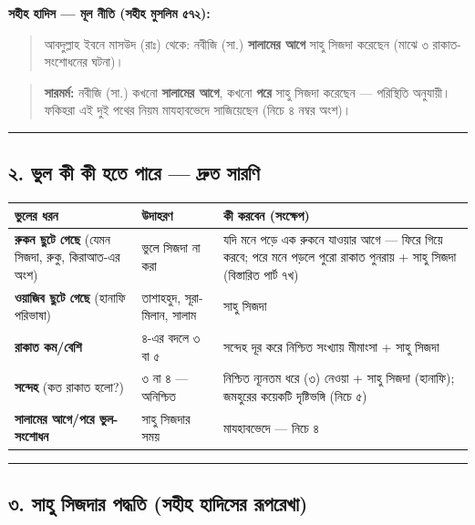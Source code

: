 \textbf{সহীহ হাদিস — মূল নীতি (সহীহ মুসলিম ৫৭২):}

\begin{quote}
আবদুল্লাহ ইবনে মাসউদ (রাঃ) থেকে: নবীজি (সা.) \textbf{সালামের আগে} সাহু সিজদা করেছেন (মাঝে ৩ রাকাত-সংশোধনের ঘটনা)।
\end{quote}

\begin{quote}
\textbf{সারমর্ম:} নবীজি (সা.) কখনো \textbf{সালামের আগে}, কখনো \textbf{পরে} সাহু সিজদা করেছেন — পরিস্থিতি অনুযায়ী। ফকিহরা এই দুই পথের নিয়ম মাযহাবভেদে সাজিয়েছেন (নিচে ৪ নম্বর অংশ)।
\end{quote}

\medskip\hrule\medskip

\subsection*{২. ভুল কী কী হতে পারে — দ্রুত সারণি}

\begin{table}[h]\centering\small
\begin{tabular}{lll}
ভুলের ধরন & উদাহরণ & কী করবেন (সংক্ষেপ) \\
\hline
\textbf{রুকন ছুটে গেছে} (যেমন সিজদা, রুকু, কিরাআত-এর অংশ) & ভুলে সিজদা না করা & যদি মনে পড়ে এক রুকনে যাওয়ার আগে — ফিরে গিয়ে করবে; পরে মনে পড়লে পুরো রাকাত পুনরায় + সাহু সিজদা (বিস্তারিত পার্ট ৭খ) \\
\textbf{ওয়াজিব ছুটে গেছে} (হানাফি পরিভাষা) & তাশাহহুদ, সূরা-মিলান, সালাম & সাহু সিজদা \\
\textbf{রাকাত কম/বেশি} & ৪-এর বদলে ৩ বা ৫ & সন্দেহ দূর করে নিশ্চিত সংখ্যায় মীমাংসা + সাহু সিজদা \\
\textbf{সন্দেহ} (কত রাকাত হলো?) & ৩ না ৪ — অনিশ্চিত & নিশ্চিত ন্যূনতম ধরে (৩) নেওয়া + সাহু সিজদা (হানাফি); জমহুরের কয়েকটি দৃষ্টিভঙ্গি (নিচে ৫) \\
\textbf{সালামের আগে/পরে ভুল-সংশোধন} & সাহু সিজদার সময় & মাযহাবভেদে — নিচে ৪ \\
\hline
\end{tabular}
\end{table}

\medskip\hrule\medskip

\subsection*{৩. সাহু সিজদার পদ্ধতি (সহীহ হাদিসের রূপরেখা)}


